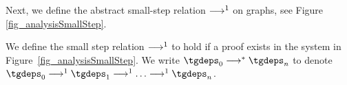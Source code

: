 \documentclass[nocopyright]{sigplanconf}
\begin{document}
Next, we define the abstract small-step relation $\nobreak\longrightarrow^1\nobreak$ on graphs, see Figure \ref{fig_analysisSmallStep}.

\begin{definition}
    \label{def_analysisSmallstep}
    We define the small step relation $\nobreak\longrightarrow^1\nobreak$ to hold if a proof exists in the system in Figure~\ref{fig_analysisSmallStep}.  We write $\tgdeps_0 \smallsteps \tgdeps_n$ to denote $\tgdeps_0 \smallstep \tgdeps_1 \smallstep \ldots \smallstep \tgdeps_n$.
\end{definition}
\end{document}

